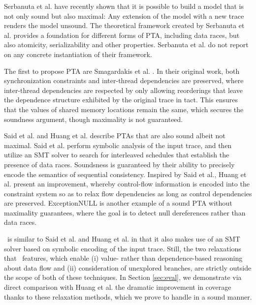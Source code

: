 Serbanuta et al. \cite{maximal} have recently shown that it is possible to build a model that is not only sound but also maximal: Any extension of the model with a new trace renders the model unsound. The theoretical framework created by Serbanuta et al. provides a foundation for different forms of PTA, including data races, but also atomicity, serializability and other properties. Serbanuta et al. do not report on any concrete instantiation of their framework.

The first to propose PTA are Smagardakis et al. \cite{yannis}. In their original work, both synchronization constraints and inter-thread dependencies are preserved, where inter-thread dependencies are respected by 
only allowing reorderings that leave the dependence structure exhibited by the original trace in tact. This ensures that the values of shared memory locations remain the same, which secures the soundness argument, though maximality is not guaranteed.

Said et al. \cite{Said:2011} and Huang et al. \cite{HuangMR14} describe PTAs that are also sound albeit not maximal. Said et al. perform symbolic analysis of the input trace, and then utilize an SMT solver to search for interleaved schedules that establish the presence of data races. Soundsness is guaranteed by their ability to precisely encode the semantics of sequential consistency. 
Inspired by Said et al., Huang et al. present an improvement, whereby control-flow information is encoded into the constraint system so as to relax flow dependencies as long as control dependencies are preserved.
ExceptionNULL \cite{Farzan:2012} is another example of a sound PTA without maximality guarantees, where the goal is to detect null dereferences rather than data races. 

\tool\ is similar to Said et al. and Huang et al. in that it also makes use of an SMT solver based on symbolic encoding of the input trace. Still, the two relaxations that \tool\ features, which enable (i) value- rather than dependence-based reasoning about data flow and (ii) consideration of unexplored branches, are strictly outside the scope of both of these techniques. In Section \ref{sec:eval}, we demonstrate via direct comparison with Huang et al. the dramatic improvement in coverage thanks to these relaxation methods, which we prove to handle in a sound manner.


